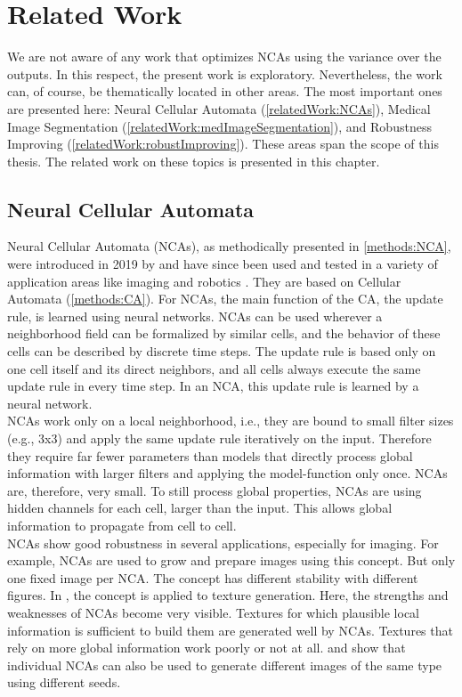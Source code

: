 \chapter{Related Work}  
\label{Related Work}
We are not aware of any work that optimizes NCAs using the variance over the outputs. In this respect, the present work is exploratory. Nevertheless, the work can, of course, be thematically located in other areas. The most important ones are presented here: Neural Cellular Automata (\autoref{relatedWork:NCAs}), Medical Image Segmentation (\autoref{relatedWork:medImageSegmentation}), and Robustness Improving (\autoref{relatedWork:robustImproving}). These areas span the scope of this thesis. The related work on these topics is presented in this chapter.


\section{Neural Cellular Automata}
\label{relatedWork:NCAs}
Neural Cellular Automata (NCAs), as methodically presented in \autoref{methods:NCA}, were introduced in 2019 by \cite{Gilpin:2019:IntroduceNCA} and have since been used and tested in a variety of application areas like imaging \cite{palm:2022:vnca} and robotics \cite{Horibe:2021:softRoboNCA}. They are based on Cellular Automata (\autoref{methods:CA}). For NCAs, the main function of the CA, the update rule, is learned using neural networks. NCAs can be used wherever a neighborhood field can be formalized by similar cells, and the behavior of these cells can be described by discrete time steps. The update rule is based only on one cell itself and its direct neighbors, and all cells always execute the same update rule in every time step. In an NCA, this update rule is learned by a neural network.\\
NCAs work only on a local neighborhood, i.e., they are bound to small filter sizes (e.g., 3x3) and apply the same update rule iteratively on the input. Therefore they require far fewer parameters than models that directly process global information with larger filters and applying the model-function only once. NCAs are, therefore, very small. To still process global properties, NCAs are using hidden channels for each cell, larger than the input. This allows global information to propagate from cell to cell. \cite{Gilpin:2019:IntroduceNCA}\\
NCAs show good robustness in several applications, especially for imaging. \cite{mordvintsev:2020:growingNCA} For example, NCAs are used to grow and prepare images using this concept. But only one fixed image per NCA. The concept has different stability with different figures. In \cite{mordvintsev:2021:textureNCAs}, the concept is applied to texture generation. Here, the strengths and weaknesses of NCAs become very visible. Textures for which plausible local information is sufficient to build them are generated well by NCAs. Textures that rely on more global information work poorly or not at all. \cite{otte:2021:generativeNCAs} and \cite{palm:2022:vnca} show that individual NCAs can also be used to generate different images of the same type using different seeds.


